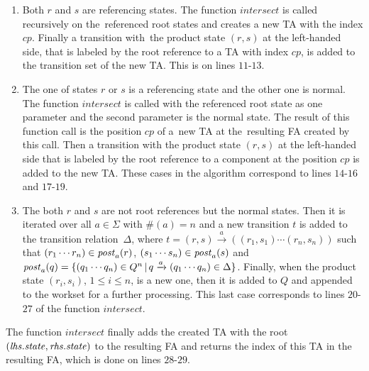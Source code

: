 \begin{enumerate}
	\item Both $r$ and $s$ are referencing states.
		The function $\mathit{intersect}$ is called recursively on the~referenced
		  root states and creates a new TA with the index $cp$.
		  Finally a transition with~the product state $(r,s)$ at the left-handed side,
		  that is labeled by the root reference to a TA with index $cp$, is added
		  to the transition set of the new TA.
		  This is on lines $11$-$13$.
	  \item The one of states $r$ or $s$ is a referencing state and the other one is normal.
			The function $\mathit{intersect}$ is called with the referenced root state as one parameter
			and the second parameter is the normal state.
    		The result of this function call is the position $cp$
			of a~new TA at the~resulting FA created by this call.
    		Then a transition with the product state $(r,s)$ at the left-handed side
			that is labeled by the root reference to a component at the position $cp$
			is added to the new TA.
    		These cases in the algorithm correspond to lines $14$-$16$ and $17$-$19$.
	  \item The both $r$ and $s$ are not root references
			but the normal states.
			Then it is iterated over all $a \in \Sigma$ with $\#(a) = n$
			and a new transition $t$ is added to the transition relation~$\Delta$,
			where $t = (r,s) \xrightarrow{a} ((r_1,s_1) \cdots (r_n, s_n))$ such that
			$(r_1 \cdots r_n) \in \mathit{post}_{a}(r)$, $(s_1 \cdots s_n) \in \mathit{post}_{a}(s)$ and
			$\mathit{post}_{a}(q) = \{(q_1 \cdots q_n) \in Q^n\,|\, q \xrightarrow{a} (q_1 \cdots q_n) \in \Delta\}$.
			Finally, when the product state $(r_i,s_i)$, $1 \leq i \leq n$, is a new one,
			then it is added to $Q$ and appended to the workset for a further processing.
			This last case corresponds to lines $20$-$27$ of the function $\mathit{intersect}$.
\end{enumerate}

The function $\mathit{intersect}$ finally adds the created TA with the root $(\mathit{lhs.state},\mathit{rhs.state})$
to the resulting FA and returns the index of this TA in the resulting FA, which is done on lines $28$-$29$.

